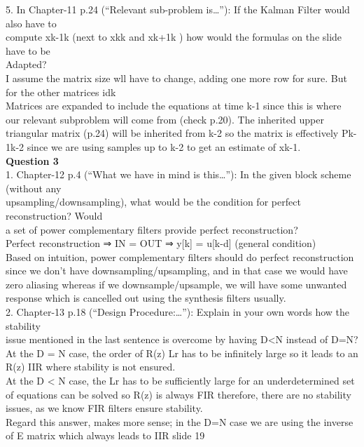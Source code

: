 \documentclass[
  a4paper,
  ,captions=tableheading
]{scrartcl}
\begin{document}
5. In Chapter-11 p.24 (``Relevant sub-problem is\ldots''): If the Kalman
Filter would also have to\\
compute xk-1\textbar k (next to xk\textbar k and xk+1\textbar k ) how
would the formulas on the slide have to be\\
Adapted?\\
I assume the matrix size wll have to change, adding one more row for
sure. But for the other matrices idk\\
Matrices are expanded to include the equations at time k-1 since this is
where our relevant subproblem will come from (check p.20). The inherited
upper triangular matrix (p.24) will be inherited from k-2 so the matrix
is effectively Pk-1\textbar k-2 since we are using samples up to k-2 to
get an estimate of xk-1.\\
\textbf{Question 3}\\
1. Chapter-12 p.4 (``What we have in mind is this\ldots''): In the given
block scheme (without any\\
upsampling/downsampling), what would be the condition for perfect
reconstruction? Would\\
a set of power complementary filters provide perfect reconstruction?\\
Perfect reconstruction ⇒ IN = OUT ⇒ y{[}k{]} = u{[}k-d{]} (general
condition)\\
Based on intuition, power complementary filters should do perfect
reconstruction since we don't have downsampling/upsampling, and in that
case we would have zero aliasing whereas if we downsample/upsample, we
will have some unwanted response which is cancelled out using the
synthesis filters usually.\\
2. Chapter-13 p.18 (``Design Procedure:\ldots''): Explain in your own
words how the stability\\
issue mentioned in the last sentence is overcome by having D\textless N
instead of D=N?\\
At the D = N case, the order of R(z) Lr has to be infinitely large so it
leads to an R(z) IIR where stability is not ensured.\\
At the D \textless{} N case, the Lr has to be sufficiently large for an
underdetermined set of equations can be solved so R(z) is always FIR
therefore, there are no stability issues, as we know FIR filters ensure
stability.\\
Regard this answer, makes more sense; in the D=N case we are using the
inverse of E matrix which always leads to IIR slide 19\\
\end{document}
